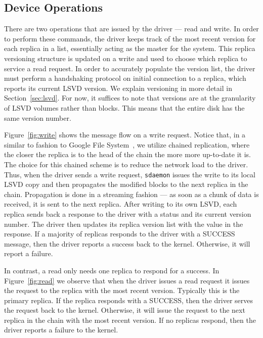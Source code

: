 \subsection{Device Operations}
\label{sec:readwrite}
There are two operations that are issued by the driver --- read and write.
In order to perform these commands, the driver keeps track of the most 
recent version for each replica in a list, essentially acting as the master
for the system. This replica versioning structure is updated on a write and 
used to choose which replica to service a read request. In order to 
accurately populate the version list, the driver must perform a handshaking 
protocol on initial connection to a replica, which reports its current LSVD
version. We explain versioning in more detail in Section~\ref{sec:lsvd}. For 
now, it suffices to note that versions are at the granularity of LSVD
volumes rather than blocks. This means that the entire disk has the same 
version number. 

Figure~\ref{fig:write} shows the message flow on a write request. Notice
that, in a similar to fashion to Google File System~\cite{ghemawat2003google}, 
we utilize chained replication, where the closer the replica is to the 
head of the chain the more more up-to-date it is. The choice for this chained
scheme is to reduce the network load to the driver. Thus, when 
the driver sends a write request, \texttt{sdaemon} issues the write to its 
local LSVD copy and then propagates the modified blocks to the next replica 
in the chain. Propagation is done in a streaming fashion --- as soon as a 
chunk of data is received, it is sent to the next replica. After writing to 
its own LSVD, each replica sends back a 
response to the driver with a status and its current version number. The 
driver then updates its replica version list with the value in the response. 
If a majority of replicas responds to the driver with a SUCCESS message, 
then the driver reports a success back to the kernel. Otherwise, it will 
report a failure. 

In contrast, a read only needs one replica to respond for a success. In 
Figure~\ref{fig:read} we observe that when the driver issues a read request 
it issues the request to the replica with the most recent version. Typically 
this is the primary replica. If the replica responds with a SUCCESS, then 
the driver serves the request back to the kernel. Otherwise, it will issue 
the request to the next replica in the chain with the most recent version. 
If no replicas respond, then the driver reports a failure to the kernel.

